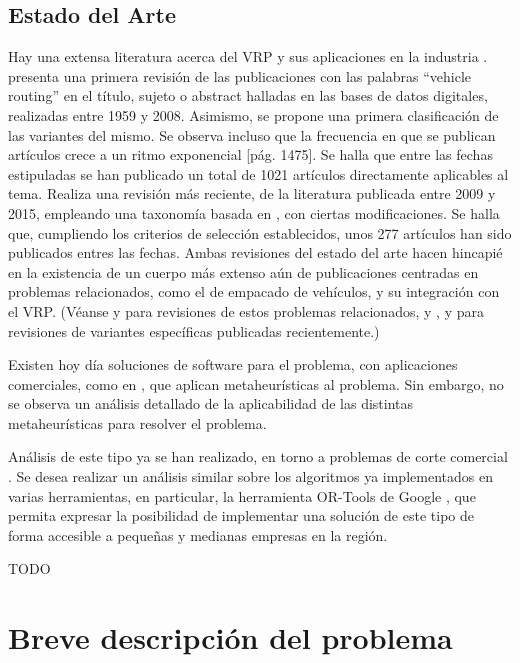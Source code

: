 \message{ !name(proposal.tex)}\documentclass[12pt]{extarticle}
\begin{document}
\subsection{Estado del Arte}
Hay una extensa literatura acerca del VRP y sus aplicaciones en la industria
\cite{pillac_review_2013} \cite{gomez_metaheuristicas_2014}.
\cite{eksioglu_vehicle_2009} presenta una primera revisión de las publicaciones
con las palabras ``vehicle routing'' en el título, sujeto o abstract halladas en
las bases de datos digitales, realizadas entre 1959 y 2008. Asimismo, se propone
una primera clasificación de las variantes del mismo. Se observa incluso que la
frecuencia en que se publican artículos crece a un ritmo exponencial [pág.
1475]. Se halla que entre las fechas estipuladas se han publicado un total de
1021 artículos directamente aplicables al tema. \cite{braekers_vehicle_2016}
Realiza una revisión más reciente, de la literatura publicada entre 2009 y 2015,
empleando una taxonomía basada en \cite{eksioglu_vehicle_2009}, con ciertas
modificaciones. Se halla que, cumpliendo los criterios de selección
establecidos, unos 277 artículos han sido publicados entres las fechas. Ambas
revisiones del estado del arte hacen hincapié en la existencia de un cuerpo más
extenso aún de publicaciones centradas en problemas relacionados, como el de
empacado de vehículos, y su integración con el VRP. (Véanse
\cite{prodhon_survey_2014} \cite{pollaris_vehicle_2015} y
\cite{golden_inventory_2008} para revisiones de estos problemas relacionados, y
\cite{pillac_review_2013}, \cite{groer_consistent_2009} y
\cite{caceres-cruz_rich_2015} para revisiones de variantes específicas
publicadas recientemente.)

Existen hoy día soluciones de software para el problema, con aplicaciones
comerciales, como en \cite{erdogan_open_2017}, que aplican metaheurísticas al
problema. Sin embargo, no se observa un análisis detallado de la aplicabilidad
de las distintas metaheurísticas para resolver el problema.

Análisis de este tipo ya se han realizado, en torno a problemas de corte
comercial \cite{gavalas_survey_2014}. Se desea realizar un análisis similar
sobre los algoritmos ya implementados en varias herramientas, en particular, la
herramienta OR-Tools de Google \cite{noauthor_or-tools_nodate}, que permita
expresar la posibilidad de implementar una solución de este tipo de forma
accesible a pequeñas y medianas empresas en la región.

TODO

\section{Breve descripción del problema}
\end{document}
